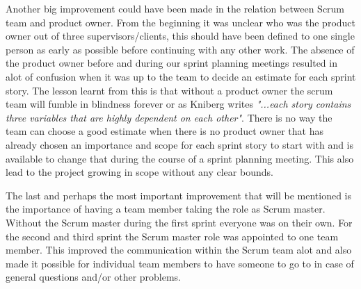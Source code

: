 Another big improvement could have been made in the relation between Scrum team and product owner.
From the beginning it was unclear who was the product owner out of three supervisors/clients, this should have been defined to one single person as early as possible before continuing with any other work.
The absence of the product owner before and during our sprint planning meetings resulted in alot of confusion when it was up to the team to decide an estimate for each sprint story.
The lesson learnt from this is that without a product owner the scrum team will fumble in blindness forever or as Kniberg writes \cite[p.~25]{kniberg07} {\em "...each story contains three variables that are highly dependent on each other"}.
There is no way the team can choose a good estimate when there is no product owner that has already chosen an importance and scope for each sprint story to start with and is available to change that during the course of a sprint planning meeting.
This also lead to the project growing in scope without any clear bounds.

The last and perhaps the most important improvement that will be mentioned is the importance of having a team member taking the role as Scrum master.
Without the Scrum master during the first sprint everyone was on their own.
For the second and third sprint the Scrum master role was appointed to one team member.
This improved the communication within the Scrum team alot and also made it possible for individual team members to have someone to go to in case of general questions and/or other problems.

%
%
